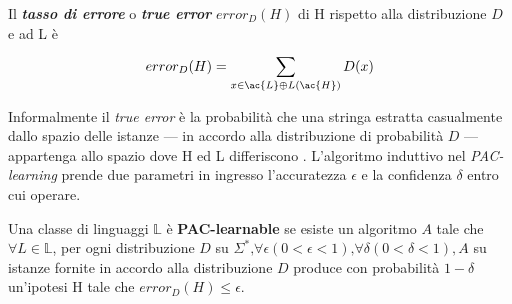 \begin{description}
\begin{definizione*}Il \textbf{\textit{tasso di errore}} o \textbf{\textit{true error}} $error_{D}(H)$ di \ac{H} rispetto alla distribuzione  $D$ e ad \ac{L} è
\begin{equation*}
    error_{D}(H) = \sum_{x \in \ac{L} \oplus L(\ac{H})}^{}D(x)
\end{equation*}
\end{definizione*}
Informalmente il \textit{true error} è la probabilità che una stringa estratta casualmente dallo spazio delle istanze --- in accordo alla distribuzione di probabilità $D$ --- appartenga allo spazio dove \ac{H} ed \ac{L} differiscono . L'algoritmo induttivo nel \textit{PAC-learning} prende due parametri in ingresso l'accuratezza $\epsilon$ e la confidenza $\delta$ entro cui operare.

\begin{definizione}Una classe di linguaggi $\mathbb{L}$ è \textbf{PAC-learnable} se esiste un algoritmo $A$ tale che $\forall L \in \mathbb{L}$, per ogni distribuzione $D$ su $\Sigma^{*} \text{,} \forall \epsilon(0<\epsilon<1) \text{,} \forall \delta(0<\delta<1), A$ su istanze fornite in accordo alla distribuzione $D$ produce con probabilità $1-\delta$ un'ipotesi \ac{H} tale che $error_{D}(H) \leq \epsilon$.
\end{definizione}
\end{description}

